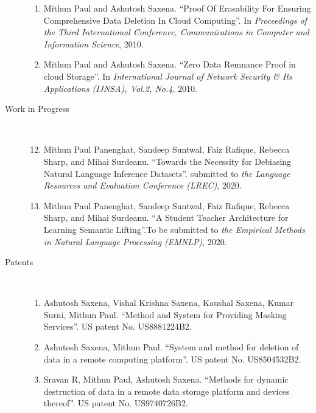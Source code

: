 \documentclass[10pt]{article}
\newcommand{\ve}[1]{{\em #1}} %
\newcommand{\ti}[1]{``#1''} %
\begin{document}
\begin{description}
\begin{enumerate}
\item  Mithun Paul and Ashutosh Saxena.   \ti{Proof Of Erasability For Ensuring Comprehensive Data Deletion In Cloud Computing}. In \ve{  Proceedings of the Third International Conference, Communications in Computer and Information Science}, 2010.

\item  Mithun Paul and Ashutosh Saxena.   \ti{Zero Data Remnance Proof in cloud Storage}. In \ve{  International Journal of Network Security \& Its Applications (IJNSA), Vol.2, No.4}, 2010.




\end{enumerate}


\item [Work in Progress] \
\begin{enumerate}
\setcounter{enumi}{11}

\item Mithun Paul Panenghat, Sandeep Suntwal, Faiz Rafique, Rebecca Sharp, and Mihai Surdeanu.   \ti{Towards the Necessity for Debiasing Natural Language Inference Datasets}. submitted to \ve{the Language Resources and Evaluation Conference (LREC)}, 2020.

\item Mithun Paul Panenghat, Sandeep Suntwal, Faiz Rafique, Rebecca Sharp, and Mihai Surdeanu.   \ti{A Student Teacher Architecture for Learning Semantic Lifting}.To be submitted to \ve {the Empirical Methods in Natural Language Processing (EMNLP)}, 2020.

\end{enumerate}


\item [Patents] \
\begin{enumerate}

\item 
Ashutosh Saxena, Vishal Krishna Saxena, Kaushal Saxena, Kumar Surni, Mithun Paul. \ti{Method and System for Providing Masking Services}.  US patent No. US8881224B2.
\item 
Ashutosh Saxena, Mithun Paul. \ti{System and method for deletion of data in a remote computing platform}.  US patent No. US8504532B2.
\item 
Sravan R, Mithun Paul, Ashutosh Saxena. \ti{Methods for dynamic destruction of data in a remote data storage platform and devices thereof}.  US patent No. US9740726B2.


\end{enumerate}



\end{description}
\end{document}
